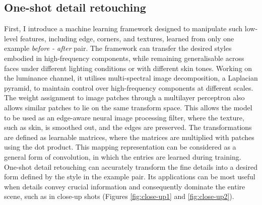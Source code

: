 \subsection{One-shot detail retouching}
First, I introduce a machine learning framework designed to manipulate such low-level features, including edge, corners, and textures, learned from only one example \textit{before - after} pair. The framework can transfer the desired styles embodied in high-frequency components, while remaining generalisable across faces under different lighting conditions or with different skin tones. Working on the luminance channel, it utilises multi-spectral image decomposition, a Laplacian pyramid, to maintain control over high-frequency components at different scales. The weight assignment to image patches through a multilayer perceptron also allows similar patches to lie on the same transform space. This allows the model to be used as an edge-aware neural image processing filter, where the texture, such as skin, is smoothed out, and the edges are preserved. The transformations are defined as learnable matrices, where the matrices are multiplied with patches using the dot product. This mapping representation can be considered as a general form of convolution, in which the entries are learned during training. One-shot detail retouching can accurately transform the fine details into a desired form defined by the style in the example pair. Its applications can be most useful when details convey crucial information and consequently dominate the entire scene, such as in close-up shots (Figures \ref{fig:close-up1} and \ref{fig:close-up2}). 





